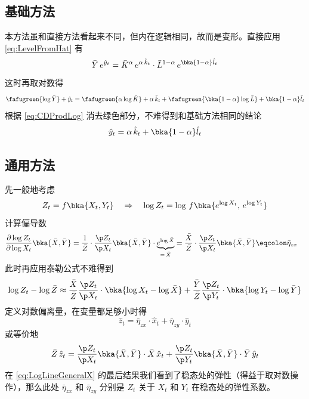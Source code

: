 \subsection{基础方法}\label{subsec:LogLineTransform}

本方法虽和直接方法看起来不同，但内在逻辑相同，故而是变形。直接应用 \ref{eq:LevelFromHat} 有
\begin{equation}
    \bar Y\,e^{\hat y_t}=\bar K^\alpha\,e^{\alpha\,\hat k_t}\cdot \bar L^{1-\alpha}\,e^{\bka{1-\alpha}\hat l_t}
\end{equation}
这时再取对数得
\begin{equation}
    \fafugreen{\log\bar Y}+\hat y_t=\fafugreen{\alpha\log\bar K}+\alpha\,\hat k_t+\fafugreen{\bka{1-\alpha}\log\bar L}+\bka{1-\alpha}\hat l_t
\end{equation}
根据 \ref{eq:CDProdLog} 消去绿色部分，不难得到和基础方法相同的结论
\begin{equation}
    \hat y_t=\alpha\,\hat k_t+\bka{1-\alpha}\hat l_t\notag
\end{equation}


\subsection{通用方法}\label{subsec:LogLineGeneral}

先一般地考虑
\begin{equation}
    Z_t=f\bka{X_t,Y_t} \quad\Rightarrow\quad \log Z_t=\log \, f\bka{e^{\log X_t}, \,e^{\log Y_t}}\notag
\end{equation}
计算偏导数
\begin{align}
    \dfrac{\partial\log Z_t}{\partial\log X_t}\bka{\bar X,\bar Y}& = \dfrac1{\bar Z}\cdot\dfrac{\p Z_t}{\p X_t}\bka{\bar X,\bar Y}\cdot \underbrace{e^{\log \bar X}}_{=\,\bar X}=\dfrac{\bar X}{\bar Z}\cdot\dfrac{\p Z_t}{\p X_t}\bka{\bar X,\bar Y}\eqcolon\bar\eta_{zx}\label{eq:LogLineGeneralX}
\end{align}
此时再应用泰勒公式不难得到
\begin{align}
    \log Z_t-\log\bar Z\approx\dfrac{\bar X}{\bar Z}\dfrac{\p Z_t}{\p X_t}\cdot\bka{\log X_t-\log\bar X}+\dfrac{\bar Y}{\bar Z}\dfrac{\p Z_t}{\p Y_t}\cdot\bka{\log Y_t-\log\bar Y}\label{eq:LogLineGeneralTaylor}
\end{align}
定义对数偏离量，在变量都足够小时得
\begin{equation}
    \hat z_t=\bar\eta_{zx}\cdot\hat x_t+\bar\eta_{zy}\cdot\hat y_t\label{eq:LogLineGeneralHat}
\end{equation}
或等价地
\begin{equation}
    \bar Z\,\hat z_t=\dfrac{\p Z_t}{\p X_t}\bka{\bar X,\bar Y}\cdot\bar X\,\hat x_t+\dfrac{\p Z_t}{\p Y_t}\bka{\bar X,\bar Y}\cdot\bar Y\,\hat y_t\label{eq:LogLineGeneralHatLevel}
\end{equation}
在 \ref{eq:LogLineGeneralX} 的最后结果我们看到了稳态处的弹性（得益于取对数操作），那么此处 \(\bar\eta_{zx}\) 和 \(\bar\eta_{zy}\) 分别是 \(Z_t\) 关于 \(X_t\) 和 \(Y_t\) 在稳态处的弹性系数。

